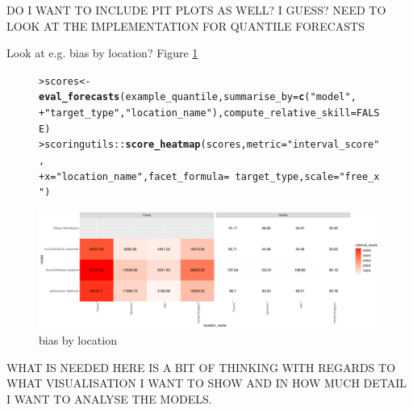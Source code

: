 \documentclass[article,shortnames]{jss}\usepackage[]{graphicx}\usepackage[]{color}
\makeatletter
\def\maxwidth{ %
  \ifdim\Gin@nat@width>\linewidth
    \linewidth
  \else
    \Gin@nat@width
  \fi
}
\newcommand{\hlnum}[1]{\textcolor[rgb]{0.686,0.059,0.569}{#1}}%
\newcommand{\hlstr}[1]{\textcolor[rgb]{0.192,0.494,0.8}{#1}}%
\newcommand{\hlopt}[1]{\textcolor[rgb]{0,0,0}{#1}}%
\newcommand{\hlstd}[1]{\textcolor[rgb]{0.345,0.345,0.345}{#1}}%
\newcommand{\hlkwb}[1]{\textcolor[rgb]{0.69,0.353,0.396}{#1}}%
\newcommand{\hlkwc}[1]{\textcolor[rgb]{0.333,0.667,0.333}{#1}}%
\newcommand{\hlkwd}[1]{\textcolor[rgb]{0.737,0.353,0.396}{\textbf{#1}}}%
\newenvironment{kframe}{%
 \def\at@end@of@kframe{}%
 \ifinner\ifhmode%
  \def\at@end@of@kframe{\end{minipage}}%
  \begin{minipage}{\columnwidth}%
 \fi\fi%
 \def\FrameCommand##1{\hskip\@totalleftmargin \hskip-\fboxsep
 \colorbox{shadecolor}{##1}\hskip-\fboxsep
     \hskip-\linewidth \hskip-\@totalleftmargin \hskip\columnwidth}%
 \MakeFramed {\advance\hsize-\width
   \@totalleftmargin\z@ \linewidth\hsize
   \@setminipage}}%
 {\par\unskip\endMakeFramed%
 \at@end@of@kframe}
\newenvironment{knitrout}{}{} %
\makeatother
\begin{document}
DO I WANT TO INCLUDE PIT PLOTS AS WELL? I GUESS? NEED TO LOOK AT THE IMPLEMENTATION FOR QUANTILE FORECASTS

% 

Look at e.g. bias by location? Figure \ref{fig:bias-heatmap}

\begin{figure}[h]
\centering
\begin{knitrout}
\color{fgcolor}\begin{kframe}
\begin{alltt}
\hlstd{> }\hlstd{scores} \hlkwb{<-} \hlkwd{eval_forecasts}\hlstd{(example_quantile,} \hlkwc{summarise_by} \hlstd{=} \hlkwd{c}\hlstd{(}\hlstr{"model"}\hlstd{,}
\hlstd{+ }    \hlstr{"target_type"}\hlstd{,} \hlstr{"location_name"}\hlstd{),} \hlkwc{compute_relative_skill} \hlstd{=} \hlnum{FALSE}\hlstd{)}
\hlstd{> }\hlstd{scoringutils}\hlopt{::}\hlkwd{score_heatmap}\hlstd{(scores,} \hlkwc{metric} \hlstd{=} \hlstr{"interval_score"}\hlstd{,}
\hlstd{+ }    \hlkwc{x} \hlstd{=} \hlstr{"location_name"}\hlstd{,} \hlkwc{facet_formula} \hlstd{=} \hlopt{~}\hlstd{target_type,} \hlkwc{scale} \hlstd{=} \hlstr{"free_x"}\hlstd{)}
\end{alltt}
\end{kframe}
\includegraphics[width=\maxwidth]{plots/plot-calibration-1} 
\end{knitrout}
\caption{\label{fig:bias-heatmap} bias by location}
\end{figure}

WHAT IS NEEDED HERE IS A BIT OF THINKING WITH REGARDS TO WHAT VISUALISATION I WANT TO SHOW AND IN HOW MUCH DETAIL I WANT TO ANALYSE THE MODELS. 
\end{document}
